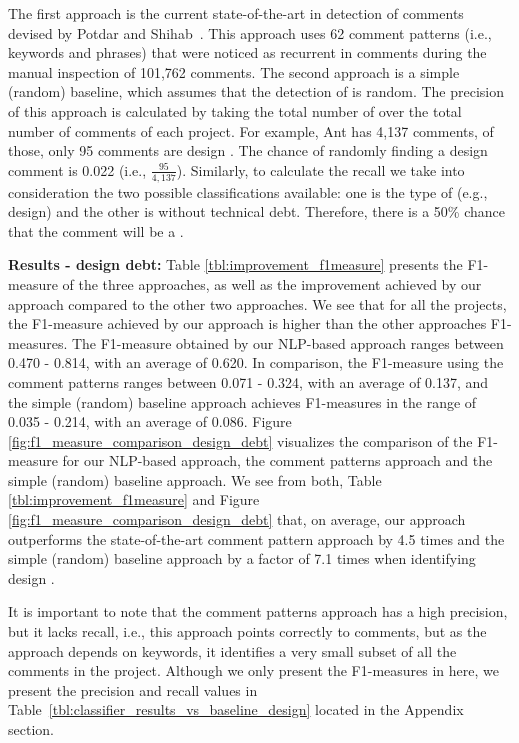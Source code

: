 The first approach is the current state-of-the-art in detection of \SATD comments devised by Potdar and Shihab~\cite{Potdar2014ICSME}. This approach uses 62 comment patterns (i.e., keywords and phrases) that were noticed as recurrent in \SATD comments during the manual inspection of 101,762 comments. The second approach is a simple (random) baseline, which assumes that the detection of \SATD is random. The precision of this approach is calculated by taking the total number of \SATD over the total number of comments of each project. For example, Ant has 4,137 comments, of those, only 95 comments are design \SATD. The chance of randomly finding a design \SATD comment is 0.022 (i.e., $\frac{95}{4,137}$). Similarly, to calculate the recall we take into consideration the two possible classifications available: one is the type of \SATD (e.g., design) and the other is without technical debt. Therefore, there is a 50\% chance that the comment will be a \SATD. 

\vspace{1mm}

\noindent \textbf{Results - design debt:} Table \ref{tbl:improvement_f1measure} presents the F1-measure of the three approaches, as well as the improvement achieved by our approach compared to the other two approaches. We see that for all the projects, the F1-measure achieved by our approach is higher than the other approaches F1-measures. The F1-measure obtained by our NLP-based approach ranges between 0.470 - 0.814, with an average of 0.620. In comparison, the F1-measure using the comment patterns ranges between 0.071 - 0.324, with an average of 0.137, and the simple (random) baseline approach achieves F1-measures in the range of 0.035 - 0.214, with an average of 0.086. Figure \ref{fig:f1_measure_comparison_design_debt} visualizes the comparison of the F1-measure for our NLP-based approach, the comment patterns approach and the simple (random) baseline approach. We see from both, Table \ref{tbl:improvement_f1measure} and Figure \ref{fig:f1_measure_comparison_design_debt} that, on average, our approach outperforms the state-of-the-art comment pattern approach by 4.5 times and the simple (random) baseline approach by a factor of 7.1 times when identifying design \SATD. 

It is important to note that the comment patterns approach has a high precision, but it lacks recall, i.e., this approach points correctly to \SATD comments, but as the approach depends on keywords, it identifies a very small subset of all the \SATD comments in the project. Although we only present the F1-measures in here, we present the precision and recall values in Table~\ref{tbl:classifier_results_vs_baseline_design} located in the Appendix section.  

